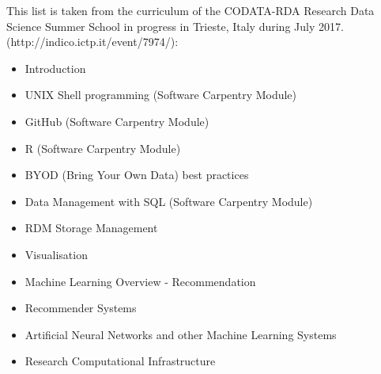 \documentclass[12pt,a4paper]{article}
\begin{document}
\begin{appendices}
This list is taken from the curriculum of the CODATA-RDA Research Data
Science Summer School in progress in Trieste, Italy during July 2017.
(http://indico.ictp.it/event/7974/):

\begin{itemize}
\item Introduction
\item UNIX Shell programming (Software Carpentry Module)
\item GitHub (Software Carpentry Module)
\item R (Software Carpentry Module)
\item BYOD (Bring Your Own Data) best practices
\item Data Management with SQL  (Software Carpentry Module)
\item RDM Storage Management
\item Visualisation
\item Machine Learning Overview - Recommendation
\item Recommender Systems
\item Artificial Neural Networks and other Machine Learning Systems
\item Research Computational Infrastructure
\end{itemize}

\end{appendices}

\sloppy
\raggedright
\clearpage
\printbibliography[title={References},heading=bibintoc]
\end{document}
